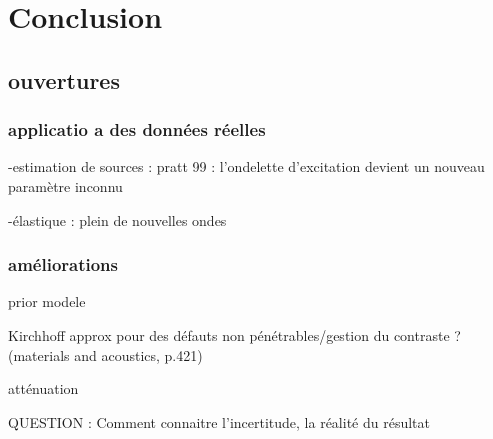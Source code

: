\chapter{Conclusion}

\section{ouvertures}

\subsection{applicatio a des données réelles}
-estimation de sources : pratt 99 : l'ondelette d'excitation devient un nouveau paramètre inconnu 

-élastique : plein de nouvelles ondes 


\subsection{améliorations}
prior modele

Kirchhoff approx pour des défauts non pénétrables/gestion du contraste ? (materials and acoustics, p.421)

atténuation

QUESTION : 
Comment connaitre l'incertitude, la réalité du résultat
